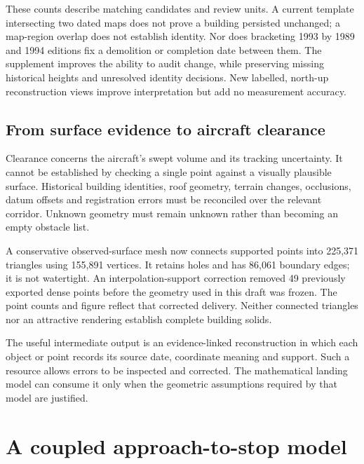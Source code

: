 These counts describe matching candidates and review units. A current template intersecting two dated maps does not prove a building persisted unchanged; a map-region overlap does not establish identity. Nor does bracketing 1993 by 1989 and 1994 editions fix a demolition or completion date between them. The supplement improves the ability to audit change, while preserving missing historical heights and unresolved identity decisions. New labelled, north-up reconstruction views improve interpretation but add no measurement accuracy.

\subsection{From surface evidence to aircraft clearance}
Clearance concerns the aircraft's swept volume and its tracking uncertainty. It cannot be established by checking a single point against a visually plausible surface. Historical building identities, roof geometry, terrain changes, occlusions, datum offsets and registration errors must be reconciled over the relevant corridor. Unknown geometry must remain unknown rather than becoming an empty obstacle list.

A conservative observed-surface mesh now connects supported points into 225,371 triangles using 155,891 vertices. It retains holes and has 86,061 boundary edges; it is not watertight. An interpolation-support correction removed 49 previously exported dense points before the geometry used in this draft was frozen. The point counts and figure reflect that corrected delivery. Neither connected triangles nor an attractive rendering establish complete building solids.

The useful intermediate output is an evidence-linked reconstruction in which each object or point records its source date, coordinate meaning and support. Such a resource allows errors to be inspected and corrected. The mathematical landing model can consume it only when the geometric assumptions required by that model are justified.


\section{A coupled approach-to-stop model}
\label{sec:model}
